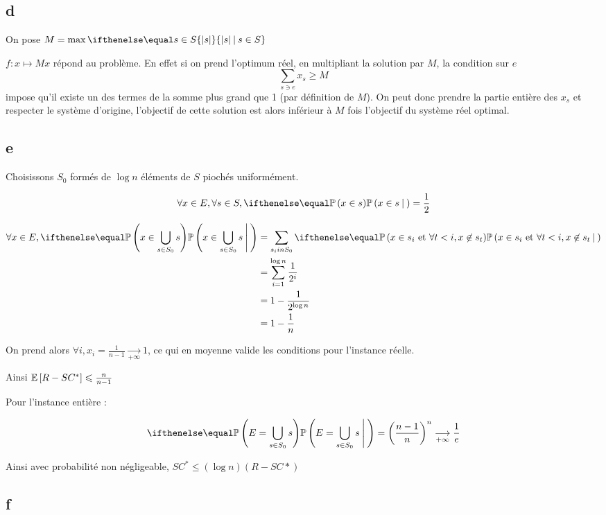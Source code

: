 \subsection*{d}
 
On pose $M=\max\set{|s|}{s\in S}$

$f : x\mapsto Mx$ répond au problème. En effet si on prend l'optimum réel, en multipliant la solution par $M$, la condition sur $e$
\[
    \sum\limits_{s \ni e} x_s \geqslant M
\]
impose qu'il existe un des termes de la somme plus grand que 1 (par définition de $M$). On peut donc prendre la partie entière des $x_s$ et respecter le système d'origine, l'objectif de cette solution est alors inférieur à $M$ fois l'objectif du système réel optimal.

\subsection*{e}


Choisissons $S_0$ formés de $\log n$ éléments de $S$ piochés uniformément.

\[
    \forall x \in E, \forall s \in S, \proba{x \in s}{}=\frac{1}{2}
\]

\[
    \begin{aligned}
        \forall x \in E, \proba{x \in \bigcup\limits_{s\in S_0} s}{} &= \sum_{s_i in S_0}\proba{x \in s_i \text{ et } \forall t<i, x \not\in s_t }{}\\
        &= \sum_{i=1}^{\log n}{\frac{1}{2^i}}\\
        &= 1-\frac{1}{2^{\log n}}\\
        &= 1-\frac{1}{n}\\
    \end{aligned}
\]

On prend alors $\forall i, x_i=\frac{1}{n-1}\underset{+\infty}{\longrightarrow} 1$, ce qui en moyenne valide les conditions pour l'instance réelle.

Ainsi $\mathbb{E}\left[ R-SC^* \right]\leqslant \frac{n}{n-1}$

Pour l'instance entière :

\[
    \proba{E=\bigcup\limits_{s\in S_0} s}{}={\left(\frac{n-1}{n}\right)}^n \underset{+\infty}{\longrightarrow} \frac{1}{e}
\]

Ainsi avec probabilité non négligeable, $SC^* \leqslant (\log n) (R-SC*)$


\subsection*{f}



